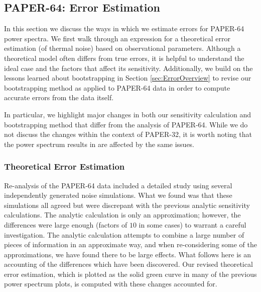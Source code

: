 \documentclass[preprint2,numberedappendix,tighten]{aastex6}  %
\begin{document}

\subsection{PAPER-64: Error Estimation}
\label{sec:Error}

In this section we discuss the ways in which we estimate errors for PAPER-64 power spectra. We first walk through an expression for a theoretical error estimation (of thermal noise) based on observational parameters. Although a theoretical model often 
differs from true errors, it is helpful to understand the ideal case and the factors 
that affect its sensitivity. Additionally, we build on the lessons learned about bootstrapping in Section \ref{sec:ErrorOverview} to 
revise our bootstrapping method as applied to PAPER-64 data in order to compute accurate errors from the data itself.

In particular, we highlight major changes in both our sensitivity calculation and bootstrapping method that differ from the  
analysis of PAPER-64. While we do not discuss the changes within the context of PAPER-32, it is worth noting that the power 
spectrum results in \citet{parsons_et_al2014} are affected by the same issues.

\subsubsection{Theoretical Error Estimation}
\label{sec:PSSense}

Re-analysis of the PAPER-64 data included a detailed study using several independently generated noise simulations. What we 
found was that these simulations all agreed but were discrepant with the previous analytic sensitivity calculations. The analytic 
calculation is only an approximation; however, the differences were large enough (factors of $10$ in some cases) to warrant a 
careful investigation. The analytic calculation attempts to combine a large number of pieces of information in an approximate 
way, and when re-considering some of the approximations, we have found there to be large effects. What follows here is an 
accounting of the differences which have been discovered. Our revised theoretical error estimation, which is plotted as the solid green curve in many of the previous power spectrum plots, is computed with these changes accounted for.
\end{document}
